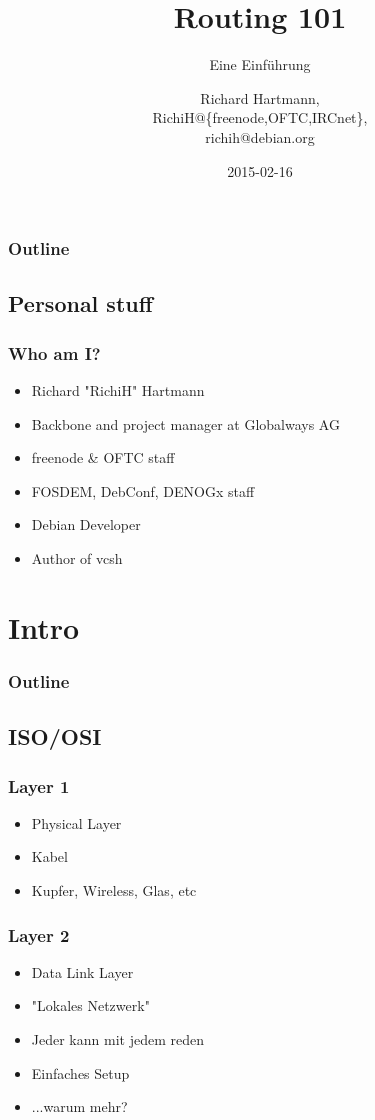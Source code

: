 \documentclass[t]{beamer}
\title{Routing 101}
\subtitle{Eine Einf\"uhrung}
\author{Richard Hartmann,\\
RichiH@\{freenode,OFTC,IRCnet\},\\
richih@debian.org}
\date{2015-02-16}
\begin{document}
\setcounter{tocdepth}{1}

\begin{frame}
	\titlepage
\end{frame}

\begin{frame}
	\frametitle{Outline}
	\tableofcontents
\end{frame}


\subsection{Personal stuff}

\begin{frame}
	\frametitle{Who am I?}
	\begin{itemize}
		\item Richard "RichiH" Hartmann
		\item Backbone and project manager at Globalways AG
		\item freenode \& OFTC staff
		\item FOSDEM, DebConf, DENOGx staff
		\item Debian Developer
		\item Author of vcsh
	\end{itemize}
\end{frame}

\section{Intro}

\begin{frame}
	\frametitle{Outline}
	\tableofcontents[currentsection]
\end{frame}

\subsection{ISO/OSI}

\begin{frame}
	\frametitle{Layer 1}
	\begin{itemize}
		\item Physical Layer
		\item Kabel
		\item Kupfer, Wireless, Glas, etc
	\end{itemize}
\end{frame}

\begin{frame}
	\frametitle{Layer 2}
	\begin{itemize}
		\item Data Link Layer
		\item "Lokales Netzwerk"
		\item Jeder kann mit jedem reden
		\item Einfaches Setup
		\item ...warum mehr?
	\end{itemize}
\end{frame}
\end{document}
